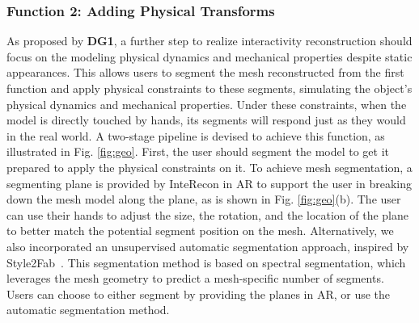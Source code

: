 \subsubsection{Function 2: Adding Physical Transforms}
As proposed by \textbf{DG1}, a further step to realize interactivity reconstruction should focus on the modeling physical dynamics and mechanical properties despite static appearances. 
This allows users to segment the mesh reconstructed from the first function and apply physical constraints to these segments, simulating the object's physical dynamics and mechanical properties. Under these constraints, when the model is directly touched by hands, its segments will respond just as they would in the real world.
A two-stage pipeline is devised to achieve this function, as illustrated in Fig. \ref{fig:geo}. 
First, the user should segment the model to get it prepared to apply the physical constraints on it.
To achieve mesh segmentation, a segmenting plane is provided by InteRecon in AR to support the user in breaking down the mesh model along the plane, as is shown in Fig. \ref{fig:geo}(b). 
The user can use their hands to adjust the size, the rotation, and the location of the plane to better match the potential segment position on the mesh. Alternatively, we also incorporated an unsupervised automatic segmentation approach, inspired by Style2Fab~\cite{10.1145/3586183.3606723}. This segmentation method is based on spectral segmentation, which leverages the mesh geometry to predict a mesh-specific number of segments. Users can choose to either segment by providing the planes in AR, or use the automatic segmentation method. 


